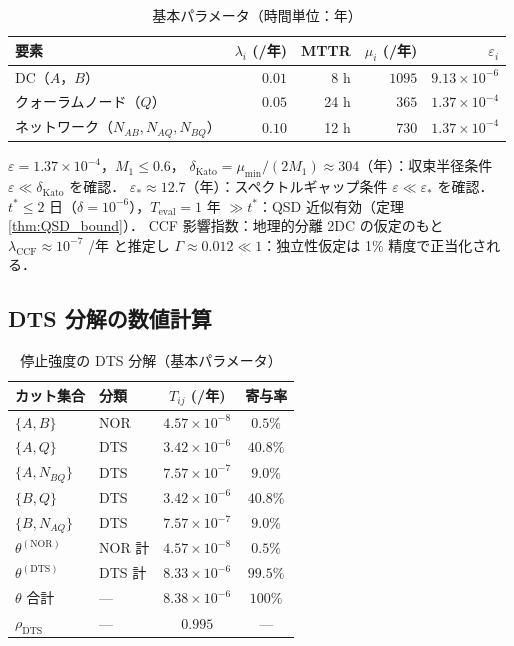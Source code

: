 \documentclass[12pt,a4paper]{article}
\theoremstyle{plain}
\theoremstyle{definition}
\theoremstyle{remark}
\newcommand{\eps}{\varepsilon}
\newcommand{\thetaNOR}{\theta^{(\mathrm{NOR})}}
\newcommand{\thetaDTS}{\theta^{(\mathrm{DTS})}}
\newcommand{\rhoDTS}{\rho_{\mathrm{DTS}}}
\newcommand{\Teval}{T_{\mathrm{eval}}}
\begin{document}
\begin{table}[H]
  \centering
  \caption{基本パラメータ（時間単位：年）}
  \label{tab:params}
  \begin{tabular}{lrrrr}
    \toprule
    要素 & $\lambda_i$ (/年) & MTTR & $\mu_i$ (/年) & $\eps_i$ \\
    \midrule
    DC（$A$，$B$）                              & $0.01$  & 8 h  & $1095$ & $9.13\times10^{-6}$ \\
    クォーラムノード（$Q$）                      & $0.05$  & 24 h & $365$  & $1.37\times10^{-4}$ \\
    ネットワーク（$N_{AB},N_{AQ},N_{BQ}$） & $0.10$  & 12 h & $730$  & $1.37\times10^{-4}$ \\
    \bottomrule
  \end{tabular}
\end{table}

$\eps=1.37\times10^{-4}$，$M_1\le0.6$，
$\delta_{\mathrm{Kato}}=\mu_{\min}/(2M_1)\approx304$（年）：収束半径条件 $\eps\ll\delta_{\mathrm{Kato}}$ を確認．
$\eps_*\approx12.7$（年）：スペクトルギャップ条件 $\eps\ll\eps_*$ を確認．
$t^*\le2$ 日（$\delta=10^{-6}$），$\Teval=1$ 年 $\gg t^*$：QSD 近似有効（定理 \ref{thm:QSD_bound}）．
CCF 影響指数：地理的分離 2DC の仮定のもと $\lambda_{\mathrm{CCF}}\approx10^{-7}$ /年 と推定し
$\Gamma\approx0.012\ll1$：独立性仮定は 1\% 精度で正当化される．

\subsection{DTS 分解の数値計算}

\begin{table}[H]
  \centering
  \caption{停止強度の DTS 分解（基本パラメータ）}
  \label{tab:DTS_decomp}
  \begin{tabular}{llcc}
    \toprule
    カット集合 & 分類 & $T_{ij}$ (/年) & 寄与率 \\
    \midrule
    $\{A,B\}$       & NOR & $4.57\times10^{-8}$ & $0.5\%$ \\
    $\{A,Q\}$       & DTS & $3.42\times10^{-6}$ & $40.8\%$ \\
    $\{A,N_{BQ}\}$  & DTS & $7.57\times10^{-7}$ & $9.0\%$ \\
    $\{B,Q\}$       & DTS & $3.42\times10^{-6}$ & $40.8\%$ \\
    $\{B,N_{AQ}\}$  & DTS & $7.57\times10^{-7}$ & $9.0\%$ \\
    \midrule
    $\thetaNOR$      & NOR 計  & $4.57\times10^{-8}$ & $0.5\%$ \\
    $\thetaDTS$      & DTS 計  & $8.33\times10^{-6}$ & $99.5\%$ \\
    $\theta$ 合計   & ---     & $8.38\times10^{-6}$ & $100\%$ \\
    \midrule
    $\rhoDTS$ & --- & $0.995$ & --- \\
    \bottomrule
  \end{tabular}
\end{table}
\end{document}
